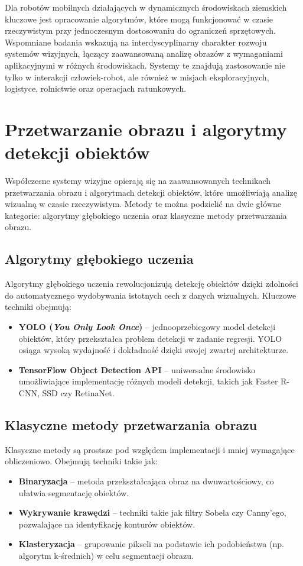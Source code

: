 \documentclass[a4paper,twoside,12pt]{book}
\begin{document}
Dla robotów mobilnych działających w dynamicznych środowiskach ziemskich kluczowe jest opracowanie algorytmów, które mogą funkcjonować w czasie rzeczywistym przy jednoczesnym dostosowaniu do ograniczeń sprzętowych. Wspomniane badania \cite{bib:aoki2001realtime} \cite{bib:matthies2007mars} wskazują na interdyscyplinarny charakter rozwoju systemów wizyjnych, łączący zaawansowaną analizę obrazów z wymaganiami aplikacyjnymi w różnych środowiskach. Systemy te znajdują zastosowanie nie tylko w interakcji człowiek-robot, ale również w misjach eksploracyjnych, logistyce, rolnictwie oraz operacjach ratunkowych.



\section{Przetwarzanie obrazu i algorytmy detekcji obiektów}
Współczesne systemy wizyjne opierają się na zaawansowanych technikach przetwarzania obrazu i algorytmach detekcji obiektów, które umożliwiają analizę wizualną w czasie rzeczywistym. Metody te można podzielić na dwie główne kategorie: algorytmy głębokiego uczenia oraz klasyczne metody przetwarzania obrazu.

\subsection{Algorytmy głębokiego uczenia}
Algorytmy głębokiego uczenia rewolucjonizują detekcję obiektów dzięki zdolności do automatycznego wydobywania istotnych cech z danych wizualnych. Kluczowe techniki obejmują:
\begin{itemize}
    \item \textbf{YOLO (\textit{You Only Look Once})} – jednooprzebiegowy model detekcji obiektów, który przekształca problem detekcji w zadanie regresji. YOLO osiąga wysoką wydajność i dokładność dzięki swojej zwartej architekturze.
    \item \textbf{TensorFlow Object Detection API} – uniwersalne środowisko umożliwiające implementację różnych modeli detekcji, takich jak Faster R-CNN, SSD czy RetinaNet.
\end{itemize}

\subsection{Klasyczne metody przetwarzania obrazu}
Klasyczne metody są prostsze pod względem implementacji i mniej wymagające obliczeniowo. Obejmują techniki takie jak:
\begin{itemize}
    \item \textbf{Binaryzacja} – metoda przekształcająca obraz na dwuwartościowy, co ułatwia segmentację obiektów.
    \item \textbf{Wykrywanie krawędzi} – techniki takie jak filtry Sobela czy Canny'ego, pozwalające na identyfikację konturów obiektów.
    \item \textbf{Klasteryzacja} – grupowanie pikseli na podstawie ich podobieństwa (np. algorytm k-średnich) w celu segmentacji obrazu.
\end{itemize}
\end{document}
